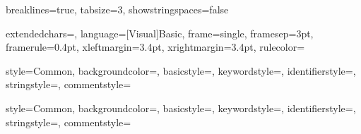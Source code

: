 \usepackage{tikz}
\usetikzlibrary{positioning,mindmap,shapes,shapes.multipart,shadows,arrows,patterns,topaths}
\usepackage{pgfplots}
\pgfplotsset{width=7cm,compat=newest}


\lstset
{
	breaklines=true,
	tabsize=3,
	showstringspaces=false
}


{
	extendedchars=\true,
	language={[Visual]Basic},
	frame=single,
	framesep=3pt,%
	framerule=0.4pt,%
	xleftmargin=3.4pt,%
	xrightmargin=3.4pt,%
	rulecolor=\color{Red}
}

{
	style=Common,
	backgroundcolor=\color{Yellow!10},
	basicstyle=\scriptsize\color{Black}\ttfamily,
	keywordstyle=\color{Orange},
	identifierstyle=\color{Cyan},
	stringstyle=\color{Red},
	commentstyle=\color{Green}
}

{
	style=Common,
	backgroundcolor=\color{Black},
	basicstyle=\scriptsize\color{White}\ttfamily,
	keywordstyle=\color{Orange},
	identifierstyle=\color{Cyan},
	stringstyle=\color{Red},
	commentstyle=\color{Green}
}
